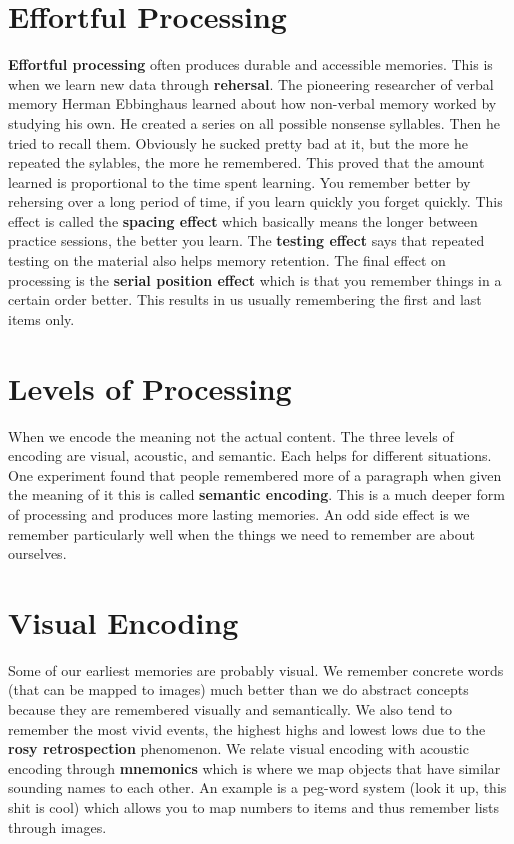 \documentclass[12pt]{article}
\begin{document}
\section*{Effortful Processing}
\textbf{Effortful processing} often produces durable and accessible memories. This is when we learn new data through \textbf{rehersal}. The pioneering researcher of verbal memory	Herman Ebbinghaus learned about how non-verbal memory worked by studying his own. He created a series on all possible nonsense syllables. Then he tried to recall them. Obviously he sucked pretty bad at it, but the more he repeated the sylables, the more he remembered. This proved that the amount learned is proportional to the time spent learning. You remember better by rehersing over a long period of time, if you learn quickly you forget quickly. This effect is called the \textbf{spacing effect} which basically means the longer between practice sessions, the better you learn. The \textbf{testing effect} says that repeated testing on the material also helps memory retention. The final effect on processing is the \textbf{serial position effect} which is that you remember things in a certain order better. This results in us usually remembering the first and last items only.
\section*{Levels of Processing}
When we encode the meaning not the actual content. The three levels of encoding are visual, acoustic, and semantic. Each helps for different situations. One experiment found that people remembered more of a paragraph when given the meaning of it this is called \textbf{semantic encoding}. This is a much deeper form of processing and produces more lasting memories. An odd side effect is we remember particularly well when the things we need to remember are about ourselves. 
\section*{Visual Encoding}
Some of our earliest memories are probably visual. We remember concrete words (that can be mapped to images) much better than we do abstract concepts because they are remembered visually and semantically. We also tend to remember the most vivid events, the highest highs and lowest lows due to the \textbf{rosy retrospection} phenomenon. We relate visual encoding with acoustic encoding through \textbf{mnemonics} which is where we map objects that have similar sounding names to each other. An example is a peg-word system (look it up, this shit is cool) which allows you to map numbers to items and thus remember lists through images. 
\end{document}
